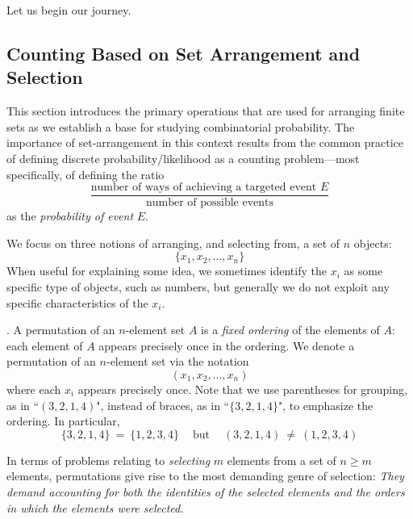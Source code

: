 \smallskip

Let us begin our journey.

\subsection{Counting Based on Set Arrangement and Selection}
\label{sec:set-arrangement}

This section introduces the primary operations that are used for arranging finite sets as we
establish a base for studying combinatorial probability.  The importance of set-arrangement
in this context results from the common practice of defining discrete probability/likelihood as a counting problem---most specifically, of defining the ratio
\[ 
\frac{\mbox{number of ways of achieving a targeted event $E$}}{\mbox{number of possible events}}
\]
as the {\it probability of event} $E$.


\medskip

We focus on three notions of arranging, and selecting from, a set of $n$ objects:
\[ \{ x_1, x_2, \ldots , x_n\} \]
When useful for explaining some idea, we sometimes identify the $x_i$ as some specific type
of objects, such as numbers, but generally we do not exploit any specific characteristics of the $x_i$.

\medskip


.
A permutation of an $n$-element set $A$ is a {\em fixed ordering} of the elements of $A$: each element of $A$ appears precisely once in the ordering.  We denote a permutation of an $n$-element set via the notation
\[ (x_1, x_2, \ldots , x_n) \]
where each $x_i$ appears precisely once.  Note that we use parentheses for grouping, as in ``$(3,2,1,4)$", instead of braces, as in ``$\{3,2,1,4\}$", to emphasize the ordering.  In particular,
\[ \{3,2,1,4\} \ = \ \{1,2,3, 4\} \ \ \ \ \mbox{ but } \ \ \ \ (3,2,1,4) \ \neq \ (1, 2, 3,4) \]

\medskip


In terms of problems relating to {\em selecting} $m$ elements from a set of $n \geq m$ elements, permutations give rise to the most demanding genre of selection: {\em They demand accounting for both the {\em identities} of the selected elements and the {\em orders} in which the elements were selected.}

\medskip

